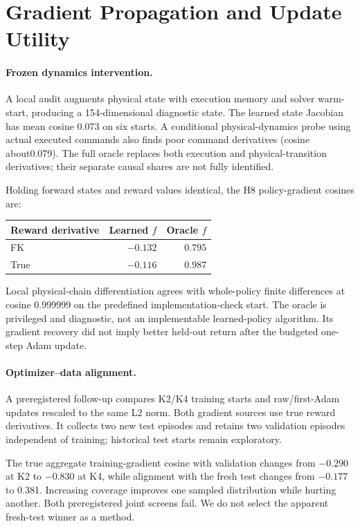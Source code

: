 \section{Gradient Propagation and Update Utility}
\paragraph{Frozen dynamics intervention.}
A local audit augments physical state with execution memory and solver warm-start, producing a 154-dimensional diagnostic state. The learned state Jacobian has mean cosine 0.073 on six starts. A conditional physical-dynamics probe using actual executed commands also finds poor command derivatives (cosine about0.079). The full oracle replaces both execution and physical-transition derivatives; their separate causal shares are not fully identified.

Holding forward states and reward values identical, the H8 policy-gradient cosines are:
\begin{center}\begin{tabular}{lrr}\toprule
Reward derivative & Learned $f$ & Oracle $f$\\\midrule
FK & $-0.132$ & $0.795$\\
True & $-0.116$ & $0.987$\\\bottomrule
\end{tabular}\end{center}
Local physical-chain differentiation agrees with whole-policy finite differences at cosine 0.999999 on the predefined implementation-check start. The oracle is privileged and diagnostic, not an implementable learned-policy algorithm. Its gradient recovery did not imply better held-out return after the budgeted one-step Adam update.

\paragraph{Optimizer--data alignment.}
A preregistered follow-up compares K2/K4 training starts and raw/first-Adam updates rescaled to the same L2 norm. Both gradient sources use true reward derivatives. It collects two new test episodes and retains two validation episodes independent of training; historical test starts remain exploratory.



The true aggregate training-gradient cosine with validation changes from $-0.290$ at K2 to $-0.830$ at K4, while alignment with the fresh test changes from $-0.177$ to 0.381. Increasing coverage improves one sampled distribution while hurting another. Both preregistered joint screens fail. We do not select the apparent fresh-test winner as a method.

